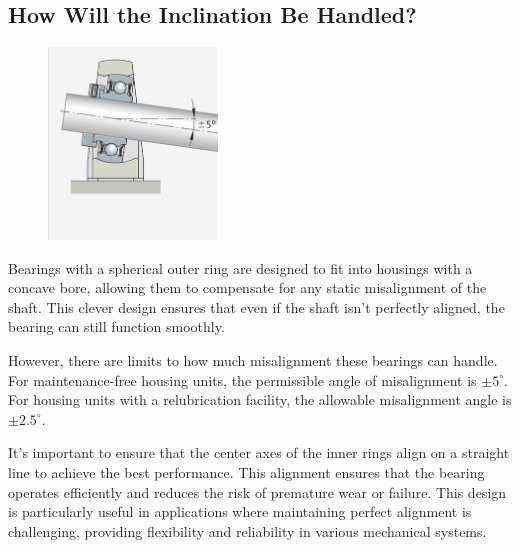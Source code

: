 \documentclass[../../main]{subfiles}
\begin{document}
\subsection{How Will the Inclination Be Handled?}
\begin{figure}[h!]
  \centering
  \includegraphics[width=0.4\textwidth]{img/Picture4.png}
  \caption{}
  \end{figure}

  Bearings with a spherical outer ring are designed to fit into housings with a concave bore, allowing them to compensate for any static misalignment of the shaft. This clever design ensures that even if the shaft isn't perfectly aligned, the bearing can still function smoothly.

However, there are limits to how much misalignment these bearings can handle. For maintenance-free housing units, the permissible angle of misalignment is $\pm 5^\circ$. For housing units with a relubrication facility, the allowable misalignment angle is $\pm 2.5^\circ$.

It's important to ensure that the center axes of the inner rings align on a straight line to achieve the best performance. This alignment ensures that the bearing operates efficiently and reduces the risk of premature wear or failure. This design is particularly useful in applications where maintaining perfect alignment is challenging, providing flexibility and reliability in various mechanical systems.
\end{document}
